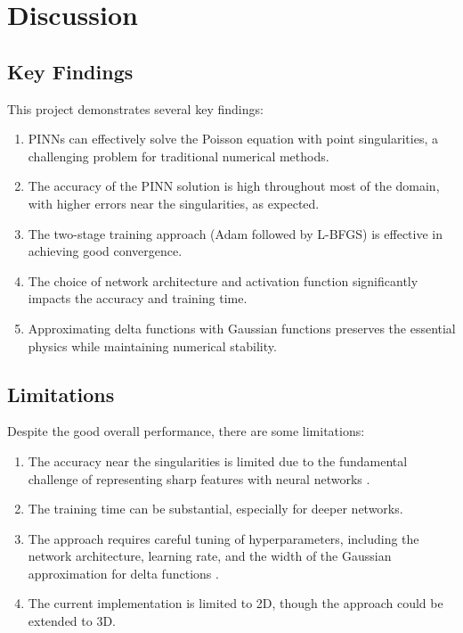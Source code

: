 \documentclass[12pt,a4paper]{report}
\begin{document}
	\chapter{Discussion}
	
	\section{Key Findings}
	This project demonstrates several key findings:
	\begin{enumerate}
		\item PINNs can effectively solve the Poisson equation with point singularities, a challenging problem for traditional numerical methods.
		\item The accuracy of the PINN solution is high throughout most of the domain, with higher errors near the singularities, as expected.
		\item The two-stage training approach (Adam followed by L-BFGS) is effective in achieving good convergence.
		\item The choice of network architecture and activation function significantly impacts the accuracy and training time.
		\item Approximating delta functions with Gaussian functions preserves the essential physics while maintaining numerical stability.
	\end{enumerate}
	
	\section{Limitations}
	Despite the good overall performance, there are some limitations:
	\begin{enumerate}
		\item The accuracy near the singularities is limited due to the fundamental challenge of representing sharp features with neural networks \cite{wang2021understanding}.
		\item The training time can be substantial, especially for deeper networks.
		\item The approach requires careful tuning of hyperparameters, including the network architecture, learning rate, and the width of the Gaussian approximation for delta functions \cite{jagtap2020adaptive}.
		\item The current implementation is limited to 2D, though the approach could be extended to 3D.
	\end{enumerate}
	
\end{document}
